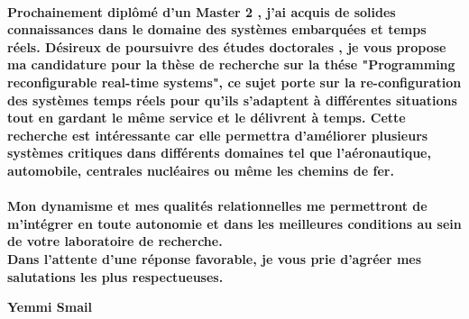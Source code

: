 \documentclass[14pt]{motivation}
\begin{document}
\paragraph{} 
\textbf{
Prochainement diplômé d'un Master 2 , j'ai acquis de solides connaissances dans le domaine des systèmes embarquées et temps réels. Désireux de poursuivre des études doctorales , je vous propose ma candidature pour la thèse de recherche sur la thése "Programming reconfigurable real-time systems", ce sujet porte sur la re-configuration des systèmes temps réels pour qu'ils s'adaptent à différentes situations tout en gardant le même service et le délivrent à temps. Cette recherche est intéressante car elle permettra d'améliorer plusieurs systèmes critiques dans différents domaines tel que l'aéronautique, automobile, centrales nucléaires ou même les chemins de fer.
}
\paragraph{} 
\textbf{
Mon dynamisme et mes qualités relationnelles me permettront de m'intégrer en toute autonomie et dans les meilleures conditions au sein de votre laboratoire de recherche.\\
Dans l'attente d'une réponse favorable, je vous prie d'agréer mes salutations les plus respectueuses.
}
\\
\begin{flushright}
\textbf{Yemmi Smail}
\end{flushright}
\end{document}
